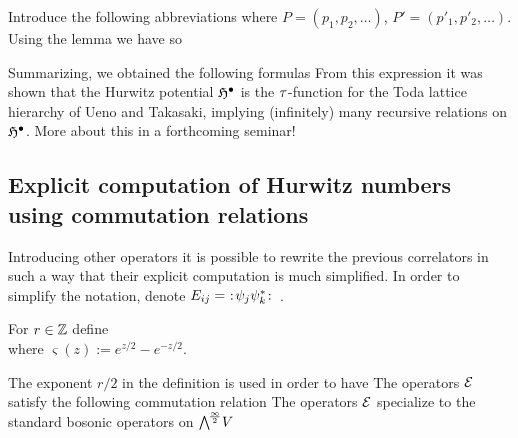 \documentclass[10pt]{beamer}
\begin{document}
\begin{frame}
Introduce the following abbreviations
where $P=(p_1,p_2,\ldots)$, $P'=(p'_1,p'_2,\ldots)$. 
Using the lemma we have
so

\end{frame}

\begin{frame}

Summarizing, we obtained the following formulas
From this expression it was shown that the Hurwitz potential $\mathfrak H^\bullet$ is the $\tau$-function for the Toda lattice hierarchy of Ueno and Takasaki, implying (infinitely) many recursive relations on $\mathfrak H^\bullet$. More about this in a forthcoming seminar!
\end{frame}

\subsection{Explicit computation of Hurwitz numbers using commutation relations}

\begin{frame}

Introducing other operators it is possible to rewrite the previous correlators in such a way that their explicit computation is much simplified. In order to simplify the notation, denote $E_{ij}=\ :\!{\psi_j\psi_k^*}\!:$\ .

\begin{definition}
	For $r\in\mathbb Z$ define\\[-15pt]
	where $\varsigma(z):=e^{z/2}-e^{-z/2}$.
\end{definition}

The exponent $r/2$ in the definition is used in order to have
The operators $\mathcal E$ satisfy the following commutation relation
The operators $\mathcal E$ specialize to the standard bosonic operators on $\bigwedge^{\!\frac\infty2}\!V$

\end{frame}
\end{document}
